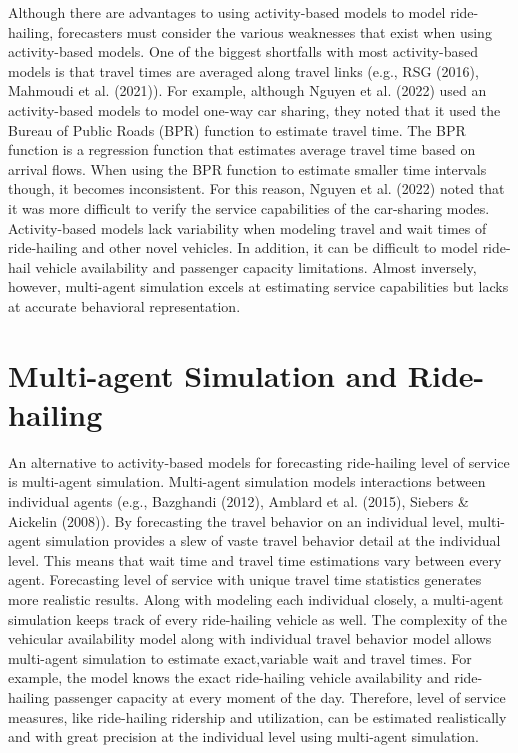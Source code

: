 \documentclass[fancy, masters]{byuthesis}
\begin{document}
Although there are advantages to using activity-based models to model ride-hailing, forecasters must consider the various weaknesses that exist when using activity-based models. One of the biggest shortfalls with most activity-based models is that travel times are averaged along travel links (e.g., RSG (2016), Mahmoudi et al. (2021)). For example, although Nguyen et al. (2022) used an activity-based models to model one-way car sharing, they noted that it used the Bureau of Public Roads (BPR) function to estimate travel time. The BPR function is a regression function that estimates average travel time based on arrival flows. When using the BPR function to estimate smaller time intervals though, it becomes inconsistent. For this reason, Nguyen et al. (2022) noted that it was more difficult to verify the service capabilities of the car-sharing modes. Activity-based models lack variability when modeling travel and wait times of ride-hailing and other novel vehicles. In addition, it can be difficult to model ride-hail vehicle availability and passenger capacity limitations. Almost inversely, however, multi-agent simulation excels at estimating service capabilities but lacks at accurate behavioral representation.

\hypertarget{lit-mas}{%
\section{Multi-agent Simulation and Ride-hailing}\label{lit-mas}}

An alternative to activity-based models for forecasting ride-hailing level of service is multi-agent simulation. Multi-agent simulation models interactions between individual agents (e.g., Bazghandi (2012), Amblard et al. (2015), Siebers \& Aickelin (2008)). By forecasting the travel behavior on an individual level, multi-agent simulation provides a slew of vaste travel behavior detail at the individual level. This means that wait time and travel time estimations vary between every agent. Forecasting level of service with unique travel time statistics generates more realistic results. Along with modeling each individual closely, a multi-agent simulation keeps track of every ride-hailing vehicle as well. The complexity of the vehicular availability model along with individual travel behavior model allows multi-agent simulation to estimate exact,variable wait and travel times. For example, the model knows the exact ride-hailing vehicle availability and ride-hailing passenger capacity at every moment of the day. Therefore, level of service measures, like ride-hailing ridership and utilization, can be estimated realistically and with great precision at the individual level using multi-agent simulation.
\end{document}

